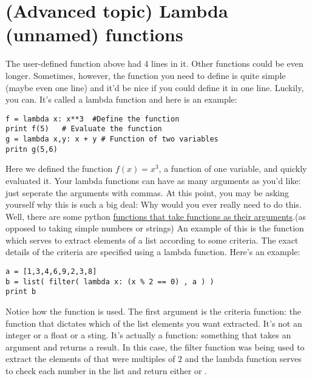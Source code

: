 \section{(Advanced topic) Lambda (unnamed) functions}
The user-defined function above had 4 lines in it.  Other functions
could be even longer.  Sometimes, however, the function you need to
define is quite simple (maybe even one line) and it'd be nice if you
could define it in one line.  Luckily, you can.  It's
called a lambda function and here is an example:
\begin{Verbatim}
f = lambda x: x**3  #Define the function
print f(5)   # Evaluate the function
g = lambda x,y: x + y # Function of two variables
pritn g(5,6)
\end{Verbatim}
Here we defined the function $f(x) = x^3$, a function of one variable,
and quickly evaluated it.  Your lambda functions can have as many
arguments as you'd like: just seperate the arguments with commas.  At
this point, you may be asking yourself why this is such a big deal:
Why would you ever really need to do this.  Well, there are some
python \underline{functions that take functions as their
  arguments}.(as opposed
to taking simple numbers or strings) An example of this is the
 function which serves to extract elements of a list
according to some criteria.  The exact details of the criteria are
specified using a lambda function.  Here's an example:
\begin{Verbatim}
a = [1,3,4,6,9,2,3,8]
b = list( filter( lambda x: (x % 2 == 0) , a ) )
print b
\end{Verbatim}
Notice how the  function is used.  The first argument
is the criteria function: the function that dictates which of the list
elements you want extracted. It's not an integer or a float or a
sting.  It's actually a function: something that takes an argument and
returns a result.  In this case, the filter function was being used to
extract the elements of  that were multiples of $2$ and the
lambda function serves to check each number in the list and return
either  or .

